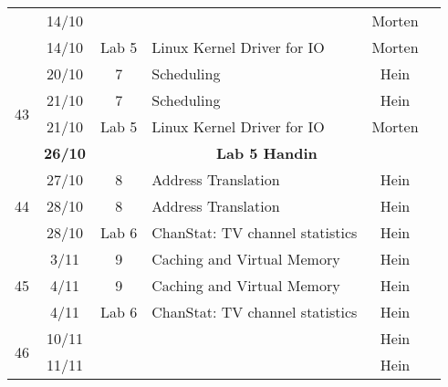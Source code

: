 \begin{table}[h]
\begin{tabular}{ccclcl}
                    & 14/10          &                  &                                        & Morten           &                                 \\
                    & 14/10          & Lab 5            & Linux Kernel Driver for IO             & Morten           &                                 \\
\multirow{4}{*}{43} & 20/10          & 7                & Scheduling                             & Hein             &                                 \\
                    & 21/10          & 7                & Scheduling                             & Hein             &                                 \\
                    & 21/10          & Lab 5            & Linux Kernel Driver for IO             & Morten           &                                 \\
                    & \textbf{26/10} & \multicolumn{4}{c}{\textbf{Lab 5 Handin}}                                                                      \\
\multirow{3}{*}{44} & 27/10          & 8                & Address Translation                    & Hein             &                                 \\
                    & 28/10          & 8                & Address Translation                    & Hein             &                                 \\
                    & 28/10          & Lab 6            & ChanStat: TV channel statistics        & Hein             &                                 \\
\multirow{3}{*}{45} & 3/11           & 9                & Caching and Virtual Memory             & Hein             &                                 \\
                    & 4/11           & 9                & Caching and Virtual Memory             & Hein             &                                 \\
                    & 4/11           & Lab 6            & ChanStat: TV channel statistics        & Hein             &                                 \\
\multirow{4}{*}{46} & 10/11          &                  &                                        & Hein             &                                 \\
                    & 11/11          &                  &                                        & Hein             &                                 \\

\end{tabular}
\end{table}

